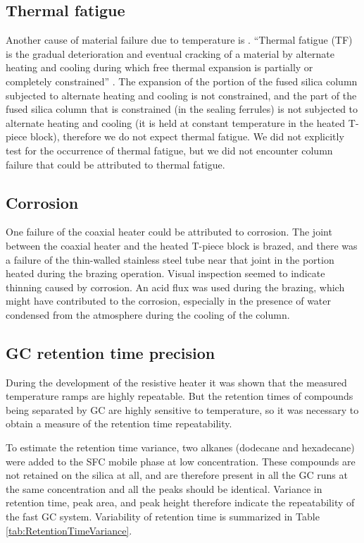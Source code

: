 \subsection{Thermal fatigue}

Another cause of material failure due to temperature is . ``Thermal fatigue (TF) is the gradual deterioration and eventual
cracking of a material by alternate heating and cooling during which free
thermal expansion is partially or completely constrained'' \autocite{Rao2001}.
The expansion of the portion of the fused silica column subjected to alternate
heating and cooling is not constrained, and the part of the fused silica column
that is constrained (in the sealing ferrules) is not subjected to alternate
heating and cooling (it is held at constant temperature in the heated T-piece
block), therefore we do not expect thermal fatigue. We did not explicitly test
for the occurrence of thermal fatigue, but we did not encounter column failure
that could be attributed to thermal fatigue.

\subsection{Corrosion}
One failure of the coaxial heater could be attributed to corrosion. The joint
between the coaxial heater and the heated T-piece block is brazed, and there was
a failure of the thin-walled stainless steel tube near that joint in the portion
heated during the brazing operation. Visual inspection seemed to indicate
thinning caused by corrosion. An acid flux was used during the brazing, which
might have contributed to the corrosion, especially in the presence of water
condensed from the atmosphere during the cooling of the column.

\subsection{GC retention time precision}

During the development of the resistive heater it was shown that the measured
temperature ramps are highly repeatable. But the retention times of  compounds
being separated by GC are highly sensitive to temperature, so it was necessary
to obtain a measure of the retention time repeatability.

To estimate the retention time variance, two alkanes (dodecane and hexadecane)
were added to the SFC mobile phase at low concentration. These compounds are not
retained on the silica at all, and are therefore present in all the GC runs at
the same concentration and all the peaks should be identical. Variance in
retention time, peak area, and peak height therefore indicate the repeatability
of the fast GC system. Variability of retention time is summarized in Table
\ref{tab:RetentionTimeVariance}.

